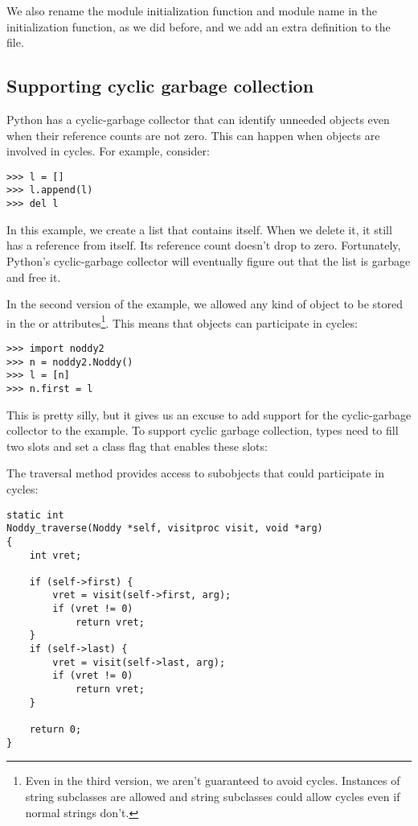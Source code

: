 We also rename the module initialization function and module name in
the initialization function, as we did before, and we add an extra
definition to the  file.

\subsection{Supporting cyclic garbage collection}

Python has a cyclic-garbage collector that can identify unneeded
objects even when their reference counts are not zero. This can happen
when objects are involved in cycles.  For example, consider:

\begin{verbatim}
>>> l = []
>>> l.append(l)
>>> del l
\end{verbatim}

In this example, we create a list that contains itself. When we delete
it, it still has a reference from itself. Its reference count doesn't
drop to zero.  Fortunately, Python's cyclic-garbage collector will
eventually figure out that the list is garbage and free it.

In the second version of the  example, we allowed any
kind of object to be stored in the  or 
attributes\footnote{Even in the third version, we aren't guaranteed to
avoid cycles.  Instances of string subclasses are allowed and string
subclasses could allow cycles even if normal strings don't.}. This
means that  objects can participate in cycles:

\begin{verbatim}
>>> import noddy2
>>> n = noddy2.Noddy()
>>> l = [n]
>>> n.first = l
\end{verbatim}

This is pretty silly, but it gives us an excuse to add support for the
cyclic-garbage collector to the  example.  To support
cyclic garbage collection, types need to fill two slots and set a
class flag that enables these slots:



The traversal method provides access to subobjects that
could participate in cycles:

\begin{verbatim}
static int
Noddy_traverse(Noddy *self, visitproc visit, void *arg)
{
    int vret;

    if (self->first) {
        vret = visit(self->first, arg);
        if (vret != 0)
            return vret;
    }
    if (self->last) {
        vret = visit(self->last, arg);
        if (vret != 0)
            return vret;
    }

    return 0;
}
\end{verbatim}

